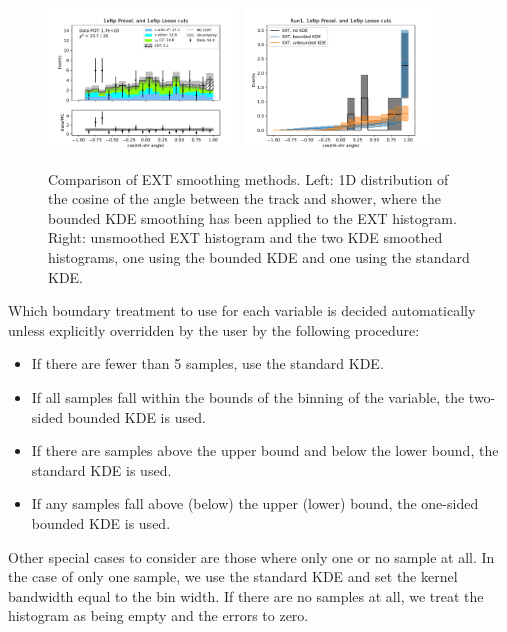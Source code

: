 \begin{figure}
    \centering
    \includegraphics[width=0.45\textwidth]{technote/SystematicsSensitivity/Figures/tksh_angle_NPL_NP_smoothed.pdf}
    \includegraphics[width=0.45\textwidth]{technote/SystematicsSensitivity/Figures/tksh_angle_NPL_NP_kde_comparison}
    \caption{Comparison of EXT smoothing methods. Left: 1D distribution of the cosine of the angle between the track and shower, where the bounded KDE smoothing has been applied to the EXT histogram. Right: unsmoothed EXT histogram and the two KDE smoothed histograms, one using the bounded KDE and one using the standard KDE.}
    \label{fig:EXT_smoothing}
\end{figure}
Which boundary treatment to use for each variable is decided automatically unless explicitly overridden by the user by the following procedure:
\begin{itemize}
    \item If there are fewer than 5 samples, use the standard KDE.
    \item If all samples fall within the bounds of the binning of the variable, the two-sided bounded KDE is used.
    \item If there are samples above the upper bound and below the lower bound, the standard KDE is used.
    \item If any samples fall above (below) the upper (lower) bound, the one-sided bounded KDE is used.
\end{itemize}
Other special cases to consider are those where only one or no sample at all. In the case of only one sample, we use the standard KDE and set the kernel bandwidth equal to the bin width. If there are no samples at all, we treat the histogram as being empty and the errors to zero.

